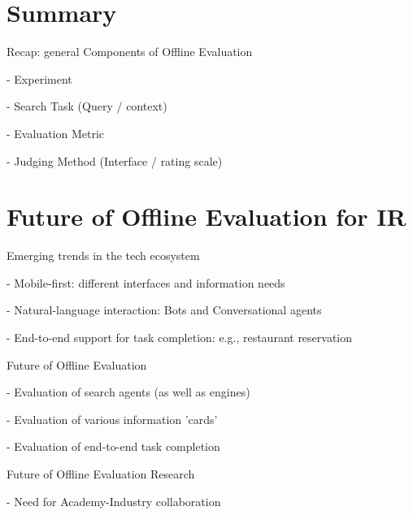 \documentclass[openany]{now} %
\newcommand{\newpar}{\bigskip\noindent}
\begin{document}
\section{Summary}

Recap: general Components of Offline Evaluation

-	Experiment

-	Search Task (Query / context)

-	Evaluation Metric

-	Judging Method (Interface / rating scale) 


\section{Future of Offline Evaluation for IR}

Emerging trends in the tech ecosystem

- Mobile-first: different interfaces and information needs

- Natural-language interaction: Bots and Conversational agents

- End-to-end support for task completion: e.g., restaurant reservation 

\newpar
Future of Offline Evaluation

- Evaluation of search agents (as well as engines)

- Evaluation of various information 'cards'

- Evaluation of end-to-end task completion

\newpar
Future of Offline Evaluation Research

- Need for Academy-Industry collaboration

\backmatter  %



	
\end{document}
